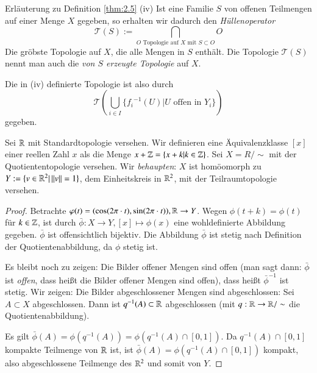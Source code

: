 \documentclass[a4paper,10pt]{scrartcl}
\begin{document}
\begin{seg}{Erläuterung zu Definition \ref{thm:2.5} (iv)} 
Ist eine Familie $ S $ von offenen Teilmengen auf einer Menge $ X $ gegeben, so erhalten wir dadurch den \emph{Hüllenoperator} 
\[ 
\mathcal T(S):=\bigcap\limits_{ O \text{ Topologie auf } X \text{ mit } S\subset O} O 
\]
Die gröbste Topologie auf $ X $, die alle Mengen in $ S $ enthält. Die Topologie $ \mathcal T(S) $ nennt man auch die \emph{von $ S $ erzeugte Topologie} auf $ X $.
\end{seg}
Die in (iv) definierte Topologie ist also durch
\[
\mathcal T(\bigcup\limits_{i\in I} \{ {f_i}^{-1}(U)|U \text{ offen in } Y_i\} )
\]
gegeben.
\begin{ex}\label{thm:2.6} Sei $ \mathbb{R} $ mit Standardtopologie versehen. Wir definieren eine Äquivalenzklasse $ [x] $ einer reellen Zahl $ x $ als die Menge $x+\mathbb{Z}=\{x+k|k\in \mathbb{Z}\}$. Sei $ X=R/\sim $ mit der Quotiententopologie versehen. Wir \emph{behaupten}: $ X $ ist homöomorph zu $ Y:=\{v\in \mathbb{R}^2|\, ||v||=1\} $, dem Einheitskreis in $ \mathbb{R}^2 $, mit der Teilraumtopologie versehen. \fixme[fig12]
\begin{proof}
Betrachte $ \varphi(t)=(\cos(2\pi\cdot t),\sin(2\pi \cdot t)), \mathbb{R}\to Y $.
Wegen $ \phi(t+k)=\phi(t) $ für $ k\in \mathbb{Z} $, ist durch $ \bar\phi: X\to Y, [x]\mapsto \phi(x) $ eine wohldefinierte Abbildung gegeben. $\bar \phi$ ist offensichtlich bijektiv. Die Abbildung $ \bar \phi  $ ist stetig nach Definition der Quotientenabbildung, da $ \phi $ stetig ist.

Es bleibt noch zu zeigen: Die Bilder offener Mengen sind offen (man sagt dann: $ \bar \phi $ ist \emph{offen}, dass heißt die Bilder offener Mengen sind offen), dass heißt $ \bar \phi^{-1} $ ist stetig. Wir zeigen: Die Bilder abgeschlossener Mengen sind abgeschlossen: Sei $ A\subset X $ abgeschlossen. Dann ist $ q^{-1}(A)\subset \mathbb{R} $ abgeschlossen (mit $ q: \mathbb{R} \to \mathbb{R}/\sim $ die Quotientenabbildung).

Es gilt $ \bar \phi(A)=\phi(q^{-1}(A))=\phi(q^{-1}(A)\cap[0,1]) $. Da $ q^{-1}(A)\cap [0,1] $ kompakte Teilmenge von $ \mathbb{R} $ ist, ist $ \bar\phi(A)=\phi(q^{-1}(A)\cap[0,1]) $ kompakt, also abgeschlossene Teilmenge des $ \mathbb{R}^2  $ und somit von $ Y $.
\end{proof}
\end{ex}
\end{document}
